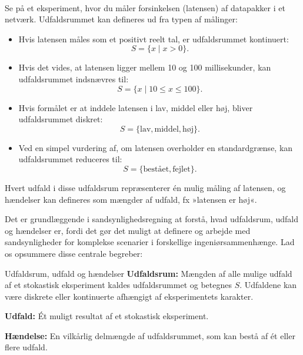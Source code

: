 \begin{example}[ Netværksforsinkelse] \\
Se på et eksperiment, hvor du måler forsinkelsen (latensen) af datapakker i et netværk. Udfaldsrummet kan defineres ud fra typen af målinger:
\begin{itemize}
    \item Hvis latensen måles som et positivt reelt tal, er udfaldsrummet kontinuert: 
    \[
    S = \{ x \mid x > 0 \}.
    \]
    \item Hvis det vides, at latensen ligger mellem 10 og 100 millisekunder, kan udfaldsrummet indsnævres til:
    \[
    S = \{ x \mid 10 \leq x \leq 100 \}.
    \]
    \item Hvis formålet er at inddele latensen i lav, middel eller høj, bliver udfaldsrummet diskret:
    \[
    S = \{\text{lav}, \text{middel}, \text{høj}\}.
    \]
    \item Ved en simpel vurdering af, om latensen overholder en standardgrænse, kan udfaldsrummet reduceres til:
    \[
    S = \{\text{bestået}, \text{fejlet}\}.
    \]
\end{itemize}
Hvert udfald i disse udfaldsrum repræsenterer én mulig måling af latensen, og hændelser kan defineres som mængder af udfald, fx »latensen er høj«.

\end{example}

Det er grundlæggende i sandsynlighedsregning at forstå, hvad udfaldsrum, udfald og hændelser er, fordi det gør det muligt at definere og arbejde med sandsynligheder for komplekse scenarier i forskellige ingeniørsammenhænge. Lad os opsummere disse centrale begreber:

\begin{definition}{Udfaldsrum, udfald og hændelser}
    \textbf{Udfaldsrum:} Mængden af alle mulige udfald af et stokastisk eksperiment kaldes udfaldsrummet og betegnes \( S \). Udfaldene kan være diskrete eller kontinuerte afhængigt af eksperimentets karakter.
    
    \textbf{Udfald:} Ét muligt resultat af et stokastisk eksperiment.
    
    \textbf{Hændelse:} En vilkårlig delmængde af udfaldsrummet, som kan bestå af ét eller flere udfald.
\end{definition}

